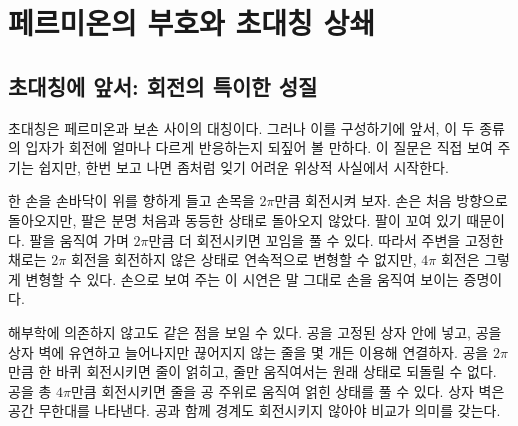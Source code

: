 \chapter{페르미온의 부호와 초대칭 상쇄}


\section{초대칭에 앞서: 회전의 특이한 성질}

초대칭은 페르미온과 보손 사이의 대칭이다. 그러나 이를 구성하기에 앞서, 이 두 종류의 입자가 회전에 얼마나 다르게 반응하는지 되짚어 볼 만하다. 이 질문은 직접 보여 주기는 쉽지만, 한번 보고 나면 좀처럼 잊기 어려운 위상적 사실에서 시작한다.

한 손을 손바닥이 위를 향하게 들고 손목을 \(2\pi\)만큼 회전시켜 보자. 손은 처음 방향으로 돌아오지만, 팔은 분명 처음과 동등한 상태로 돌아오지 않았다. 팔이 꼬여 있기 때문이다. 팔을 움직여 가며 \(2\pi\)만큼 더 회전시키면 꼬임을 풀 수 있다. 따라서 주변을 고정한 채로는 \(2\pi\) 회전을 회전하지 않은 상태로 연속적으로 변형할 수 없지만, \(4\pi\) 회전은 그렇게 변형할 수 있다. 손으로 보여 주는 이 시연은 말 그대로 손을 움직여 보이는 증명이다.

해부학에 의존하지 않고도 같은 점을 보일 수 있다. 공을 고정된 상자 안에 넣고, 공을 상자 벽에 유연하고 늘어나지만 끊어지지 않는 줄을 몇 개든 이용해 연결하자. 공을 \(2\pi\)만큼 한 바퀴 회전시키면 줄이 얽히고, 줄만 움직여서는 원래 상태로 되돌릴 수 없다. 공을 총 \(4\pi\)만큼 회전시키면 줄을 공 주위로 움직여 얽힌 상태를 풀 수 있다. 상자 벽은 공간 무한대를 나타낸다. 공과 함께 경계도 회전시키지 않아야 비교가 의미를 갖는다.

\begin{classroomqa}\end{classroomqa}

